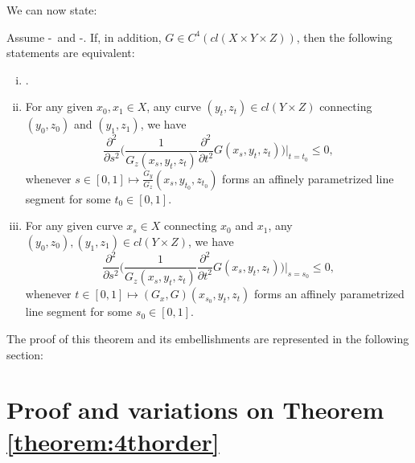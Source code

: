 We can now state:
\medskip

\begin{theorem}\label{theorem:4thorder}
	Assume \Gzero-\Gtwo\ and \Gfour-\Geight. If, in addition, $G\in C^4(cl(X\times Y \times Z)
	)$,  then the following statements are equivalent:
	\begin{enumerate}[(i)]
		\item \Gthree.
		
		\item 	 For any given  $x_0, x_1\in X$, any curve $(y_t, z_t) \in cl( Y \times Z)$ connecting $(y_0,z_0)$ and $(y_1, z_1)$, we have 
		\begin{equation*}
		\frac{\partial^2}{\partial s^2 }\Biggl(\frac1{G_z(x_s, y_t, z_t)}\frac{\partial^2}{\partial t^2} G(x_s,y_t,z_t) \Biggr)\Bigg|_{t=t_0}\le 0,
		\end{equation*}
		whenever  { $s\in [0,1] \longmapsto \frac{G_y}{G_z}(x_s, y_{t_0}, z_{t_0})$} forms an affinely parametrized line segment for some $t_0 \in [0,1]$.
		
		
		\item For any given curve $x_s\in X$ connecting $x_0$ and $x_1$,  any $(y_0, z_0),  (y_1, z_1) \in cl( Y \times Z) $, we have 
		\begin{equation*}
		\frac{\partial^2}{\partial s^2 }\Biggl(\frac{1}{G_z(x_s, y_t, z_t)}\frac{\partial^2}{\partial t^2} G(x_s,y_t,z_t) \Biggr)\Bigg|_{s=s_0}\le 0,
		\end{equation*}
		whenever $t\in [0,1] \longmapsto (G_x, G)(x_{s_0}, y_t, z_t)$  forms an affinely parametrized line segment for some $s_0\in [0,1]$.
		
	\end{enumerate} 
\end{theorem}

The proof of this theorem and its embellishments are represented in the following section:



\section{Proof and variations on Theorem \ref{theorem:4thorder}}\label{A:4thorder}




